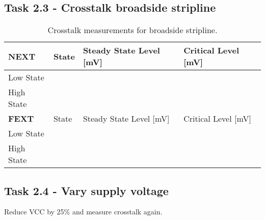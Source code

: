 \documentclass[../main.tex]{subfiles}
\begin{document}
\subsection{Task 2.3 - Crosstalk broadside stripline}

\begin{table}[h]
    \centering
    \begin{tabular}{l|l l l}
        \toprule[1pt]
        \textbf{NEXT} & State & Steady State Level [mV] & Critical Level [mV] \\
        \midrule
        Low State & & & \\
        High State & & & \\
        \midrule[1pt]
        \textbf{FEXT} & State & Steady State Level [mV] & Critical Level [mV] \\
        \midrule
        Low State & & & \\
        High State & & & \\
        \bottomrule[1pt]
    \end{tabular}
    \caption{Crosstalk measurements for broadside stripline.}
    \label{tab:meas-broadside-stripline}
\end{table}

\subsection{Task 2.4 - Vary supply voltage}

Reduce VCC by 25\% and measure crosstalk again.
\end{document}
